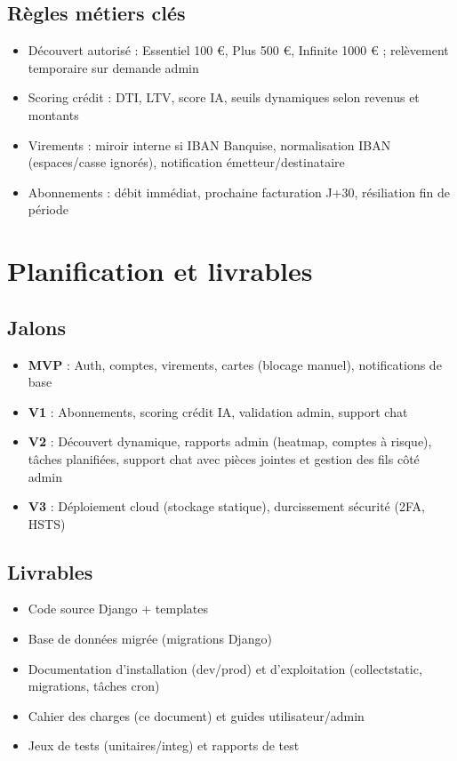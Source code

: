 \documentclass[12pt,a4paper]{report}
\begin{document}
\section{Règles métiers clés}
\begin{itemize}[leftmargin=1.5cm]
    \item Découvert autorisé : Essentiel 100 €, Plus 500 €, Infinite 1000 € ; relèvement temporaire sur demande admin
    \item Scoring crédit : DTI, LTV, score IA, seuils dynamiques selon revenus et montants
    \item Virements : miroir interne si IBAN Banquise, normalisation IBAN (espaces/casse ignorés), notification émetteur/destinataire
    \item Abonnements : débit immédiat, prochaine facturation J+30, résiliation fin de période
\end{itemize}

\chapter{Planification et livrables}

\section{Jalons}
\begin{itemize}[leftmargin=1.5cm]
    \item \textbf{MVP} : Auth, comptes, virements, cartes (blocage manuel), notifications de base
    \item \textbf{V1} : Abonnements, scoring crédit IA, validation admin, support chat
    \item \textbf{V2} : Découvert dynamique, rapports admin (heatmap, comptes à risque), tâches planifiées, support chat avec pièces jointes et gestion des fils côté admin
    \item \textbf{V3} : Déploiement cloud (stockage statique), durcissement sécurité (2FA, HSTS)
\end{itemize}

\section{Livrables}
\begin{itemize}[leftmargin=1.5cm]
    \item Code source Django + templates
    \item Base de données migrée (migrations Django)
    \item Documentation d’installation (dev/prod) et d’exploitation (collectstatic, migrations, tâches cron)
    \item Cahier des charges (ce document) et guides utilisateur/admin
    \item Jeux de tests (unitaires/integ) et rapports de test
\end{itemize}
\end{document}
